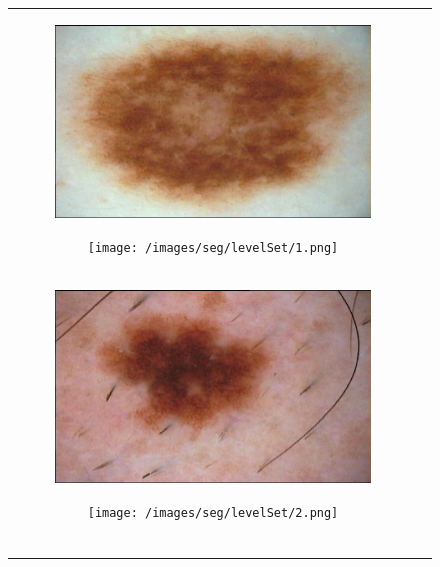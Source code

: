 \documentclass[a4paper, 10pt, conference]{ieeeconf}        %
\begin{document}
 \begin{figure}[ht!]
  \centering
  \begin{tabular}{c c}
  \begin{subfigure}{0.2\textwidth}
  \includegraphics[scale=0.15]{original01.JPG}
  \caption{}
  \end{subfigure}
  \begin{subfigure}{0.2\textwidth}
  \texttt{[image: /images/seg/levelSet/1.png]}
  \caption{}
  \end{subfigure}\\
  \begin{subfigure}{0.2\textwidth}
   \includegraphics[scale=0.15]{original02.JPG}
   \caption{}
   \end{subfigure}
   \begin{subfigure}{0.2\textwidth}
   \texttt{[image: /images/seg/levelSet/2.png]}
   \caption{}
   \end{subfigure}\\
  \begin{subfigure}{0.2\textwidth}

\end{subfigure}
\end{tabular}
\end{figure}
\end{document}
